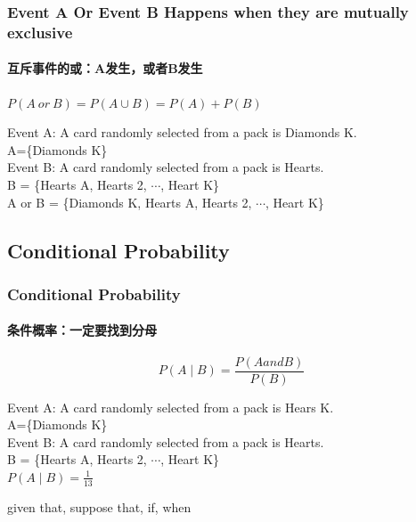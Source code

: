 \documentclass[
	11pt, %
]{beamer}
\begin{document}


\begin{frame}
	\frametitle{Event A Or Event B Happens when they are mutually exclusive}
	\framesubtitle{互斥事件的或：A发生，或者B发生}
	
	\begin{definition}
	 $P(A\ or\ B) = P(A \cup B) = P(A)  + P(B)$
	\end{definition}
	\begin{example}
		Event A: A card randomly selected from a pack is Diamonds K.\\
		A=\{Diamonds K\}\\
		Event B: A card randomly selected from a pack is Hearts.\\
		B = \{Hearts A, Hearts 2, $\cdots$, Heart K\}\\
		A or B = \{Diamonds K, Hearts A, Hearts 2, $\cdots$, Heart K\}
	\end{example}
\end{frame}


\subsection{Conditional Probability}


\begin{frame}
	\frametitle{Conditional Probability}
	\framesubtitle{条件概率：一定要找到分母}
	
	\begin{definition}
	 $$P(A\mid B) = \frac{P(A and B)}{P(B)}$$
	\end{definition}
	\begin{example}
		Event A: A card randomly selected from a pack is Hears K.\\
		A=\{Diamonds K\}\\
		Event B: A card randomly selected from a pack is Hearts.\\
		B = \{Hearts A, Hearts 2, $\cdots$, Heart K\}\\
		$P(A \mid B)  = \frac{1}{13}$
	\end{example}
	\alert{given that, suppose that, if, when}
\end{frame}

\end{document}
